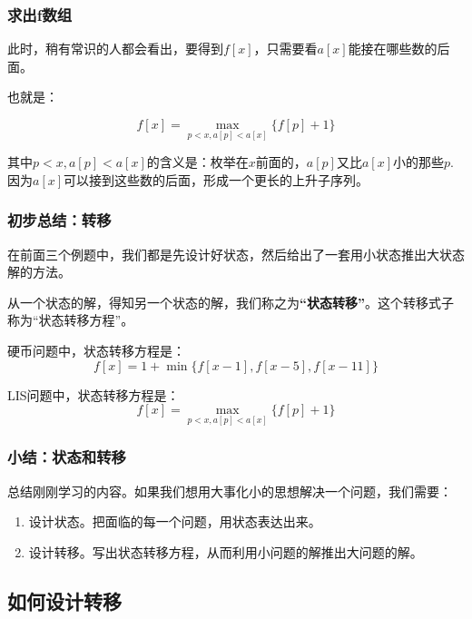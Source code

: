 \documentclass{beamer}
\begin{document}
\begin{frame}
    \frametitle{求出f数组}

    此时，稍有常识的人都会看出，要得到$f[x]$，只需要看$a[x]$能接在哪些数的后面。
    
    也就是：

    \[f[x] = \max_{p<x , a[p]<a[x]} \{f[p]+1\}\]

    其中$p<x,a[p]<a[x]$的含义是：枚举在$x$前面的，$a[p]$又比$a[x]$小的那些$p$. 因为$a[x]$可以接到这些数的后面，形成一个更长的上升子序列。

\end{frame}

\begin{frame}
    \frametitle{初步总结：转移}

    在前面三个例题中，我们都是先设计好状态，然后给出了一套用小状态推出大状态解的方法。

    从一个状态的解，得知另一个状态的解，我们称之为\textbf{“状态转移”}。这个转移式子称为“状态转移方程”。

    \begin{example}
        硬币问题中，状态转移方程是：
        \[ f[x] = 1+\min\{f[x-1], f[x-5], f[x-11]\} \]

        LIS问题中，状态转移方程是：
        \[f[x] = \max_{p<x , a[p]<a[x]} \{f[p]+1\}\]
    

    \end{example}

\end{frame}

\begin{frame}
    \frametitle{小结：状态和转移}

    总结刚刚学习的内容。如果我们想用大事化小的思想解决一个问题，我们需要：

    \begin{enumerate}
        \item 设计状态。把面临的每一个问题，用状态表达出来。
        \item 设计转移。写出状态转移方程，从而利用小问题的解推出大问题的解。
    \end{enumerate}

\end{frame}

\subsection{如何设计转移}
\end{document}
